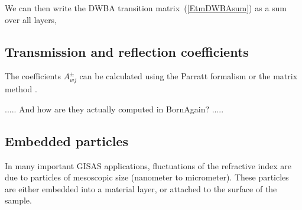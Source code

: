 %
We can then write the DWBA transition matrix~(\ref{EtmDWBAsum}) as
a sum over all layers,
%

\subsection{Transmission and reflection coefficients}

The coefficients $A^\pm_{wj}$
can be calculated using the Parratt formalism \cite{Par54}
or the matrix method \cite{BoWo99}.

..... And how are they actually computed in BornAgain? .....

\subsection{Embedded particles}

%
%
%
In many important GISAS applications,
fluctuations of the refractive index are due to particles
of mesoscopic size (nanometer to micrometer).
These particles are either embedded into a material layer,
or attached to the surface of the sample.


